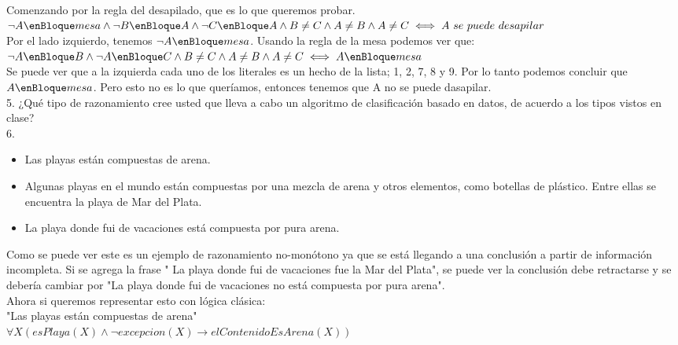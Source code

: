 Comenzando por la regla del desapilado, que es lo que queremos probar. \\ 

$\neg A \enBloque mesa \wedge \neg B \enBloque A \wedge \neg C \enBloque A \wedge B \neq C \wedge A \neq B \wedge A \neq C \iff A\ se\ puede\ desapilar$ \\

Por el lado izquierdo, tenemos $\neg A \enBloque mesa$. Usando la regla de la mesa podemos ver que: \\

$\neg A \enBloque B \wedge \neg A \enBloque C \wedge B \neq C \wedge A \neq B \wedge A \neq C \iff A \enBloque mesa$ \\

Se puede ver que a la izquierda cada uno de los literales es un hecho de la lista; 1, 2, 7, 8 y 9. Por lo tanto podemos concluir que $A \enBloque mesa$. Pero esto no es lo que queríamos, entonces tenemos que A no se puede dasapilar.\\


5. ¿Qué tipo de razonamiento cree usted que lleva a cabo un algoritmo de clasificación basado en datos, de acuerdo a los tipos vistos en clase?\\

6. 
\begin{itemize}
	\item Las playas están compuestas de arena.
	\item Algunas playas en el mundo están compuestas por una mezcla de arena y otros elementos, como botellas de plástico. Entre ellas se encuentra la playa de Mar del Plata.
	\item La playa donde fui de vacaciones está compuesta por pura arena.
\end{itemize}

Como se puede ver este es un ejemplo de razonamiento no-monótono ya que se está llegando a una conclusión a partir de información incompleta. Si se agrega la frase "
La playa donde fui de vacaciones fue la Mar del Plata", se puede ver la conclusión debe retractarse y se debería cambiar por "La playa donde fui de vacaciones no está compuesta por pura arena". \\

Ahora si queremos representar esto con lógica clásica: \\

"Las playas están compuestas de arena" \\

$\forall X (esPlaya(X) \land \neg excepcion(X) \longrightarrow elContenidoEsArena(X))$ \\

